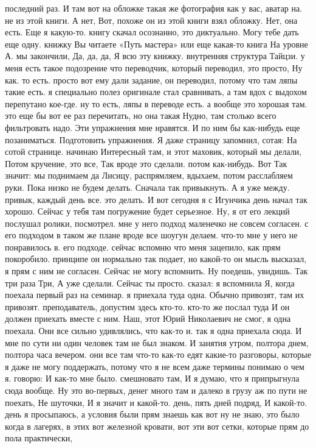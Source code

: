 \bye
 последний раз. И там вот на обложке такая же фотография как у вас, аватар на.
не из этой книги. А нет, Вот, похоже он из этой книги взял обложку. Нет, она есть.
Еще я какую-то.
книгу скачал осознанно, это диктуально. Могу тебе дать еще одну.
книжку Вы читаете «Путь мастера» или еще какая-то книга На уровне А. мы закончили, Да, да, да, Я всю эту книжку. внутренняя структура Тайцзи. у меня есть такое подозрение что переводчик, который переводил,
это просто, Ну как.
то есть. просто вот ему дали задание, он переводил, потому что там ляпы такие есть. я специально полез оригинале стал сравнивать, а там вдох с выдохом перепутано кое-где. ну то есть, ляпы в переводе есть. а вообще это хорошая там.
это еще бы вот ее раз перечитать, но она такая Нудно, там столько всего фильтровать надо.
Эти упражнения мне нравятся.
И по ним бы как-нибудь еще позаниматься.
Подготовить упражнения.
Я даже страницу запомнил, сотая:
На сотой странице.
начинаю Интересный там, и этот маховик, который мы делали, Потом кручение, это все, Так вроде это сделали.
потом как-нибудь. Вот Так значит: мы поднимаем да Лисицу, распрямляем, вдыхаем, потом расслабляем руки.
Пока низко не будем делать. Сначала так привыкнуть.
А я уже между.
привык, каждый день все.
это делать. И вот сегодня я с Игунчика день начал так хорошо. Сейчас у тебя там погружение будет серьезное. Ну, я от его лекций послушал ролики, посмотрел. мне у него подход маленечко не совсем согласен.
с его подходом в таком же плане вроде все шоугун делаем. что-то мне у него не понравилось в.
его подходе. сейчас вспомню что меня зацепило, как прям покоробило.
принципе он нормально так подает, но какой-то он мысль высказал, я прям с ним не согласен. Сейчас не могу вспомнить. Ну поедешь, увидишь.
Так три раза Три, А уже сделали.
Сейчас ты просто.
сказал: я вспомнила Я, когда поехала первый раз на семинар. я приехала туда одна. Обычно привозят,
там их привозят.
преподаватель, допустим здесь кто-то. кто-то же послал туда И он должен приехать вместе с ним. Наш, этот Юрий Николаевич не смог, я одна поехала. Они все сильно удивлялись, что как-то и.
так я одна приехала сюда.
И мне по сути ни один человек там не был знаком.
И занятия утром, полтора днем, полтора часа вечером. они все там что-то как-то едят какие-то разговоры, которые я даже не могу поддержать, потому что я не всем даже термины понимаю о чем я.
говорю: И как-то мне было.
смешновато там, И я думаю, что я припрыгнула сюда вообще. Ну это во-первых, денег много там и далеко в грузу аж по пути не поехать, Не шуточки, И я значит и какой-то.
день, пять дней подряд, И какой-то.
день я просыпаюсь, а условия были прям знаешь как вот ну не знаю, это было когда в лагерях, в этих вот железной кровати, вот эти вот сетки, которые прям до пола практически,
